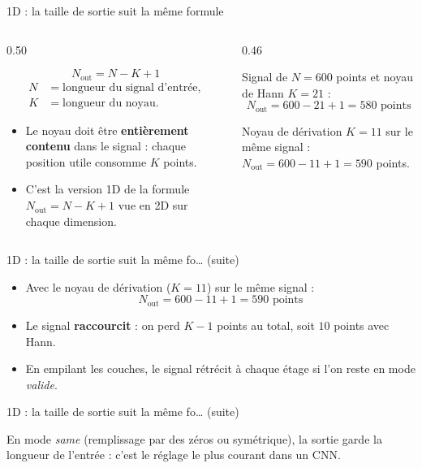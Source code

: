 \begin{frame}{1D : la taille de sortie suit la même formule}
\begin{columns}[t]
\begin{column}{0.50\textwidth}
\begin{kbox}
\[
N_{\text{out}} = N - K + 1
\]
\[
\begin{aligned}
N &= \text{longueur du signal d'entrée},\\
K &= \text{longueur du noyau}.
\end{aligned}
\]
\end{kbox}
\begin{itemize}
  \item Le noyau doit être \textbf{entièrement contenu} dans le signal :
  chaque position utile consomme $K$ points.
  \item C'est la version 1D de la formule $N_{\text{out}} = N - K + 1$ vue
  en 2D sur chaque dimension.
\end{itemize}
\end{column}
\begin{column}{0.46\textwidth}
\begin{ebox}
Signal de $N = 600$ points et noyau de Hann $K = 21$ :
\[
N_{\text{out}} = 600 - 21 + 1 = 580 \text{ points}
\]
\end{ebox}
\begin{solbox}
Noyau de dérivation $K = 11$ sur le même signal :
$N_{\text{out}} = 600 - 11 + 1 = 590$ points.
\end{solbox}
\end{column}
\end{columns}
\end{frame}
\begin{frame}{1D : la taille de sortie suit la même fo… (suite)}
\begin{itemize}
  \item Avec le noyau de dérivation ($K = 11$) sur le même signal :
  \[
  N_{\text{out}} = 600 - 11 + 1 = 590 \text{ points}
  \]
  \item Le signal \textbf{raccourcit} : on perd $K - 1$ points au total, soit
  $10$ points avec Hann.
  \item En empilant les couches, le signal rétrécit à chaque étage si l'on
  reste en mode \emph{valide}.
\end{itemize}
\end{frame}
\begin{frame}{1D : la taille de sortie suit la même fo… (suite)}
\begin{wbox}[En pratique]
En mode \emph{same} (remplissage par des zéros ou symétrique), la sortie
garde la longueur de l'entrée : c'est le réglage le plus courant dans un CNN.
\end{wbox}
\end{frame}

